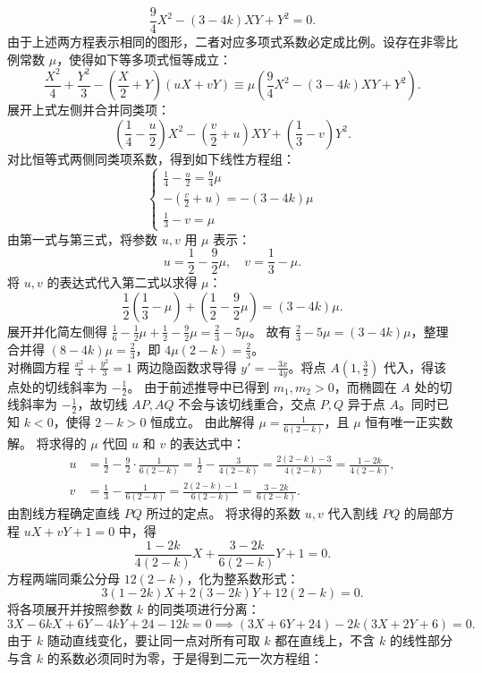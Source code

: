 \begin{solution}
\[ \frac{9}{4}X^2 - (3 - 4k)XY + Y^2 = 0. \]
由于上述两方程表示相同的图形，二者对应多项式系数必定成比例。设存在非零比例常数 $\mu$，使得如下等多项式恒等成立：
\[ \frac{X^2}{4} + \frac{Y^2}{3} - \left(\frac{X}{2} + Y\right)(uX + vY) \equiv \mu \left( \frac{9}{4}X^2 - (3 - 4k)XY + Y^2 \right). \]
展开上式左侧并合并同类项：
\[ \left(\frac{1}{4} - \frac{u}{2}\right)X^2 - \left(\frac{v}{2} + u\right)XY + \left(\frac{1}{3} - v\right)Y^2. \]
对比恒等式两侧同类项系数，得到如下线性方程组：
\[ \begin{cases} \frac{1}{4} - \frac{u}{2} = \frac{9}{4}\mu \\ -\left(\frac{v}{2} + u\right) = -(3 - 4k)\mu \\ \frac{1}{3} - v = \mu \end{cases} \]
由第一式与第三式，将参数 $u, v$ 用 $\mu$ 表示：
\[ u = \frac{1}{2} - \frac{9}{2}\mu, \quad v = \frac{1}{3} - \mu. \]
将 $u, v$ 的表达式代入第二式以求得 $\mu$：
\[ \frac{1}{2}\left(\frac{1}{3} - \mu\right) + \left(\frac{1}{2} - \frac{9}{2}\mu\right) = (3 - 4k)\mu. \]
展开并化简左侧得 $\frac{1}{6} - \frac{1}{2}\mu + \frac{1}{2} - \frac{9}{2}\mu = \frac{2}{3} - 5\mu$。
故有 $\frac{2}{3} - 5\mu = (3 - 4k)\mu$，整理合并得 $(8 - 4k)\mu = \frac{2}{3}$，即 $4\mu(2 - k) = \frac{2}{3}$。\\
对椭圆方程 $\frac{x^2}{4} + \frac{y^2}{3} = 1$ 两边隐函数求导得 $y' = -\frac{3x}{4y}$。将点 $A\left(1, \frac{3}{2}\right)$ 代入，得该点处的切线斜率为 $-\frac{1}{2}$。
由于前述推导中已得到 $m_1, m_2 > 0$，而椭圆在 $A$ 处的切线斜率为 $-\frac12$，故切线 $AP, AQ$ 不会与该切线重合，交点 $P, Q$ 异于点 $A$。同时已知 $k < 0$，使得 $2 - k > 0$ 恒成立。
由此解得 $\mu = \frac{1}{6(2 - k)}$，且 $\mu$ 恒有唯一正实数解。
将求得的 $\mu$ 代回 $u$ 和 $v$ 的表达式中：
\begin{align*}
u &= \frac{1}{2} - \frac{9}{2} \cdot \frac{1}{6(2 - k)} = \frac{1}{2} - \frac{3}{4(2 - k)} = \frac{2(2 - k) - 3}{4(2 - k)} = \frac{1 - 2k}{4(2 - k)}, \\
v &= \frac{1}{3} - \frac{1}{6(2 - k)} = \frac{2(2 - k) - 1}{6(2 - k)} = \frac{3 - 2k}{6(2 - k)}.
\end{align*}
由割线方程确定直线 $PQ$ 所过的定点。
将求得的系数 $u, v$ 代入割线 $PQ$ 的局部方程 $uX + vY + 1 = 0$ 中，得
\[ \frac{1 - 2k}{4(2 - k)}X + \frac{3 - 2k}{6(2 - k)}Y + 1 = 0. \]
方程两端同乘公分母 $12(2 - k)$，化为整系数形式：
\[ 3(1 - 2k)X + 2(3 - 2k)Y + 12(2 - k) = 0. \]
将各项展开并按照参数 $k$ 的同类项进行分离：
\[ 3X - 6kX + 6Y - 4kY + 24 - 12k = 0 \implies (3X + 6Y + 24) - 2k(3X + 2Y + 6) = 0. \]
由于 $k$ 随动直线变化，要让同一点对所有可取 $k$ 都在直线上，不含 $k$ 的线性部分与含 $k$ 的系数必须同时为零，于是得到二元一次方程组：

\end{solution}
